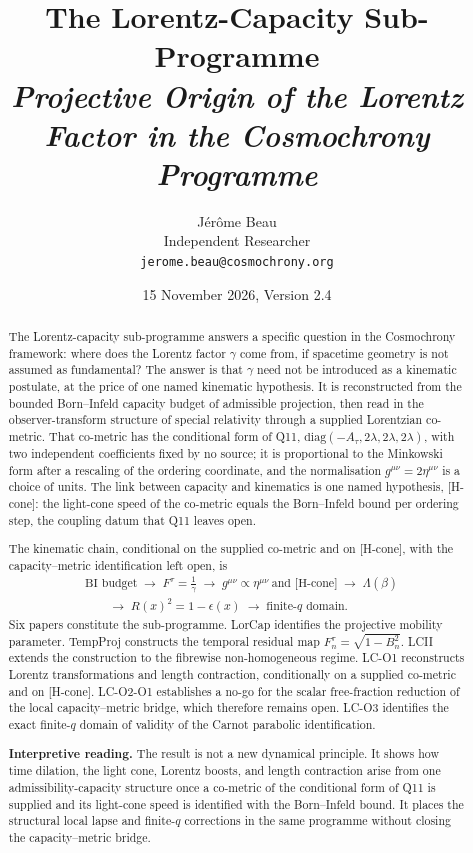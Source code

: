 \documentclass[12pt,a4paper]{article}
\title{The Lorentz-Capacity Sub-Programme\\[4pt]
\normalsize\itshape Projective Origin of the Lorentz Factor in the Cosmochrony Programme}
\author{J\'er\^ome Beau\\[2pt]
\small Independent Researcher\\
\small \texttt{jerome.beau@cosmochrony.org}}
\date{15 November 2026, Version 2.4}
\theoremstyle{remark}
\begin{document}
  \maketitle

  \begin{abstract}
    The Lorentz-capacity sub-programme answers a specific question in the Cosmochrony
    framework: where does the Lorentz factor $\gamma$ come from, if spacetime geometry is not
    assumed as fundamental?
    The answer is that $\gamma$ need not be introduced as a kinematic postulate, at the price of one named kinematic
    hypothesis.
    It is reconstructed from the bounded Born--Infeld capacity budget of admissible projection,
    then read in the observer-transform structure of special relativity through a supplied Lorentzian co-metric.
    That co-metric has the conditional form of Q11, $\mathrm{diag}(-A_\tau, 2\lambda, 2\lambda, 2\lambda)$, with two
    independent coefficients fixed by no source; it is proportional to the Minkowski form after a rescaling of the
    ordering coordinate, and the normalisation $g^{\mu\nu} = 2\eta^{\mu\nu}$ is a choice of units.
    The link between capacity and kinematics is one named hypothesis, [H-cone]: the light-cone speed of the
    co-metric equals the Born--Infeld bound per ordering step, the coupling datum that Q11 leaves open.

    The kinematic chain, conditional on the supplied co-metric and on [H-cone], with the capacity--metric
    identification left open, is
    \begin{align*}
      &\text{BI budget}
      \;\to\;
      F^\tau = \tfrac{1}{\gamma}
      \;\to\;
      g^{\mu\nu}\propto\eta^{\mu\nu}\ \text{and [H-cone]}
      \;\to\;
      \Lambda(\beta)\\
      &\qquad\to\;
      R(x)^2 = 1-\epsilon(x)
      \;\to\;
      \text{finite-}q\text{ domain.}
    \end{align*}
    Six papers constitute the sub-programme.
    LorCap identifies the projective mobility parameter.
    TempProj constructs the temporal residual map $F^\tau_n =
    \sqrt{1-B_n^2}$.
    LCII extends the construction to the fibrewise non-homogeneous
    regime.
    LC-O1 reconstructs Lorentz transformations and length
    contraction, conditionally on a supplied co-metric and on [H-cone].
    LC-O2-O1 establishes a no-go for the scalar free-fraction
    reduction of the local capacity--metric bridge, which therefore remains open.
    LC-O3 identifies the exact finite-$q$ domain of validity of the
    Carnot parabolic identification.

    \textbf{Interpretive reading.}
    The result is not a new dynamical principle.
    It shows how time dilation, the light cone, Lorentz boosts, and length contraction arise from
    one admissibility-capacity structure once a co-metric of the conditional form of Q11 is supplied and its
    light-cone speed is identified with the Born--Infeld bound.
    It places the structural local lapse and finite-$q$ corrections in the same programme without
    closing the capacity--metric bridge.
  \end{abstract}
\end{document}
